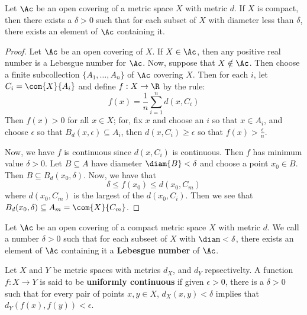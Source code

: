 \begin{lemma}\label{3.6.5}
    Let $\Ac$ be an open covering of a metric space $X$ with metric $d$. If $X$
    is compact, then there exists a  $\delta>0$ such that for each subset of
    $X$ with diameter less than  $\delta$, there exists an element of  $\Ac$
    containing it.
\end{lemma}
\begin{proof}
    Let $\Ac$ be an open covering of  $X$. If  $X \in \Ac$, then any positive
    real number is a Lebesgue number for  $\Ac$. Now, suppose that  $X \notin
    \Ac$. Then choose a finite subcollection  $\{A_1, \dots, A_n\}$ of $\Ac$
    covering  $X$. Then for each  $i$, let  $C_i=\com{X}{A_i}$ and define $f:X
    \rightarrow \R$ by the rule:
    \begin{equation}
        f(x) = \frac{1}{n}\sum_{i=1}^{n}{d(x,C_i)}
    \end{equation}
    Then $f(x)>0$ for all $x \in X$; for, fix $x$ and choose an  $i$ so that
    $x \in A_i$, and choose $\epsilon$ so that $B_d(x,\epsilon) \subseteq A_i$,
    then  $d(x,C_i) \geq \epsilon$ so that $f(x)>\frac{\epsilon}{n}$.

    Now, we have $f$ is continuous since  $d(x,C_i)$ is continuous. Then $f$ has
    minimum value  $\delta>0$. Let $B \subseteq A$ have diameter
    $\diam{B}<\delta$ and choose a point $x_0 \in B$. Then $B \subseteq
    B_d(x_0,\delta)$. Now, we have that
    \begin{equation*}
        \delta \leq f(x_0) \leq d(x_0,C_m)
    \end{equation*}
    where $d(x_0,C_m)$ is the largest of the $d(x_0,C_i)$. Then we see that
    $B_d(x_0,\delta) \subseteq A_m=\com{X}{C_m}$.
\end{proof}

\begin{definition}
    Let $\Ac$ be an open covering of a compact metric space $X$ with metric $d$.
    We call a number $\delta>0$ such that for each subseet of  $X$ with
    $\diam<\delta$, there exists an element of  $\Ac$ containing it a
    \textbf{Lebesgue number} of $\Ac$.
\end{definition}

\begin{definition}
    Let $X$ and  $Y$ be metric spaces with metrics $d_X$, and  $d_Y$
    repsectivelty. A function $f:X \rightarrow Y$ is said to be
    \textbf{uniformly continuous} if given $\epsilon>0$, there is a  $\delta>0$
    such that for every pair of points  $x,y \in X$, $d_X(x,y)<\delta$ implies
    that $d_Y(f(x),f(y))<\epsilon$.
\end{definition}

